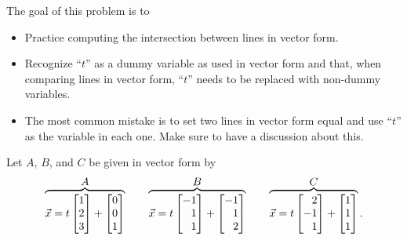 	\bookonlynewpage
	\question
	\begin{annotation}
		\begin{goals}

			The goal of this problem is to
			\begin{itemize}
				\item Practice computing the intersection between lines
					in vector form.
				\item Recognize ``$t$'' as a dummy variable as used
					in vector form and that, when comparing lines in
					vector form, ``$t$'' needs to be replaced with
					non-dummy variables.
			\end{itemize}
		\end{goals}

		\begin{notes}
			\begin{itemize}
				\item The most common mistake is to set two lines
					in vector form equal and use ``$t$'' as
					the variable in each one. Make sure to have a discussion
					about this.
			\end{itemize}
		\end{notes}
	\end{annotation}
	Let $A$, $B$, and $C$ be given in vector form by
	\[
	\overbrace{\vec x=t\mat{1\\2\\3}+\mat{0\\0\\1}}^{\displaystyle A}
	\qquad \overbrace{\vec x=t\mat{-1\\1\\1}+\mat{-1\\1\\2}}^{\displaystyle B}
	\qquad \overbrace{\vec x=t\mat{2\\-1\\1}+\mat{1\\1\\1}}^{\displaystyle C}.
	\]
